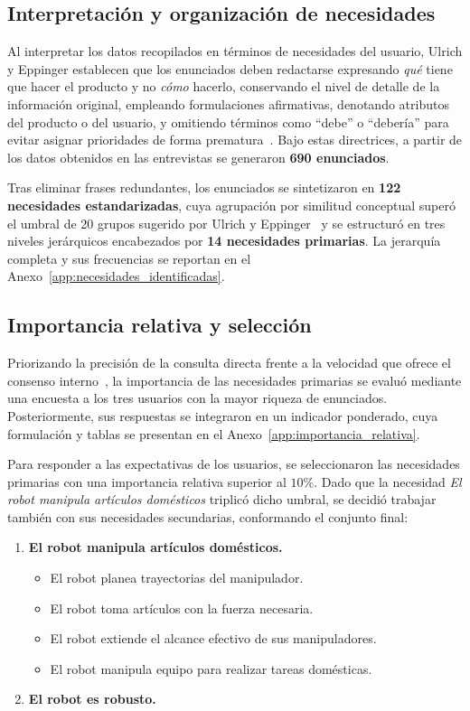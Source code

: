 \subsection{Interpretación y organización de necesidades}

Al interpretar los datos recopilados en términos de necesidades del usuario, Ulrich y Eppinger establecen que los enunciados deben redactarse expresando \emph{qué} tiene que hacer el producto y no \emph{cómo} hacerlo, conservando el nivel de detalle de la información original, empleando formulaciones afirmativas, denotando atributos del producto o del usuario, y omitiendo términos como ``debe'' o ``debería'' para evitar asignar prioridades de forma prematura~\cite{Ulrich-Eppinger}. Bajo estas directrices, a partir de los datos obtenidos en las entrevistas se generaron \textbf{690 enunciados}.

Tras eliminar frases redundantes, los enunciados se sintetizaron en \textbf{122 necesidades estandarizadas}, cuya agrupación por similitud conceptual superó el umbral de 20 grupos sugerido por Ulrich y Eppinger~\cite{Ulrich-Eppinger} y se estructuró en tres niveles jerárquicos encabezados por \textbf{14 necesidades primarias}. La jerarquía completa y sus frecuencias se reportan en el Anexo~\ref{app:necesidades_identificadas}.

\subsection{Importancia relativa y selección}

Priorizando la precisión de la consulta directa frente a la velocidad que ofrece el consenso interno~\cite{Ulrich-Eppinger}, la importancia de las necesidades primarias se evaluó mediante una encuesta a los tres usuarios con la mayor riqueza de enunciados. Posteriormente, sus respuestas se integraron en un indicador ponderado, cuya formulación y tablas se presentan en el Anexo~\ref{app:importancia_relativa}.

Para responder a las expectativas de los usuarios, se seleccionaron las necesidades primarias con una importancia relativa superior al $10\%$. Dado que la necesidad \textit{El robot manipula artículos domésticos} triplicó dicho umbral, se decidió trabajar también con sus necesidades secundarias, conformando el conjunto final:

\begin{enumerate}
    \item \textbf{El robot manipula artículos domésticos.}
    \begin{itemize}
        \item El robot planea trayectorias del manipulador.
        \item El robot toma artículos con la fuerza necesaria.
        \item El robot extiende el alcance efectivo de sus manipuladores.
        \item El robot manipula equipo para realizar tareas domésticas.
    \end{itemize}
    \item \textbf{El robot es robusto.}
\end{enumerate}

